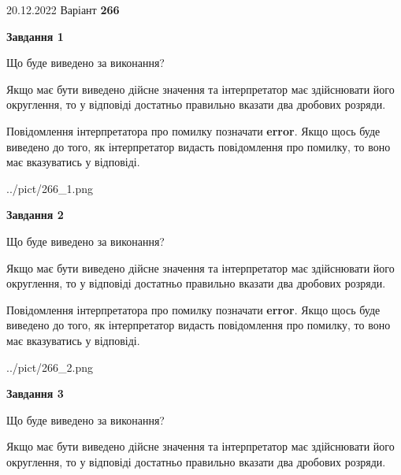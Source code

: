 \documentclass[12pt, ukrainian]{article}
\begin{document}
{20.12.2022 Варіант \No \textbf { 266 }\par}
{
\begin {Large}

{\begin {center}\textbf{Завдання 1}\end {center}}\par
Що буде виведено за виконання? \par

Якщо має бути виведено дійсне значення та інтерпретатор має здійснювати його округлення, 
то у відповіді достатньо правильно вказати два дробових розряди.

Повідомлення інтерпретатора про помилку позначати \textbf{error}.
Якщо щось буде виведено до того, як інтерпретатор видасть повідомлення про помилку, 
то воно має вказуватись у відповіді. \par

\begin{center}
	{../pict/266_1.png}
\end{center}
\newpage

{\begin {center}\textbf{Завдання 2}\end {center}}\par
Що буде виведено за виконання? \par

Якщо має бути виведено дійсне значення та інтерпретатор має здійснювати його округлення, 
то у відповіді достатньо правильно вказати два дробових розряди.

Повідомлення інтерпретатора про помилку позначати \textbf{error}.
Якщо щось буде виведено до того, як інтерпретатор видасть повідомлення про помилку, 
то воно має вказуватись у відповіді. \par

\begin{center}
	{../pict/266_2.png}
\end{center}
\newpage

{\begin {center}\textbf{Завдання 3}\end {center}}\par
Що буде виведено за виконання? \par

Якщо має бути виведено дійсне значення та інтерпретатор має здійснювати його округлення, 
то у відповіді достатньо правильно вказати два дробових розряди.


\end{Large}}
\end{document}

